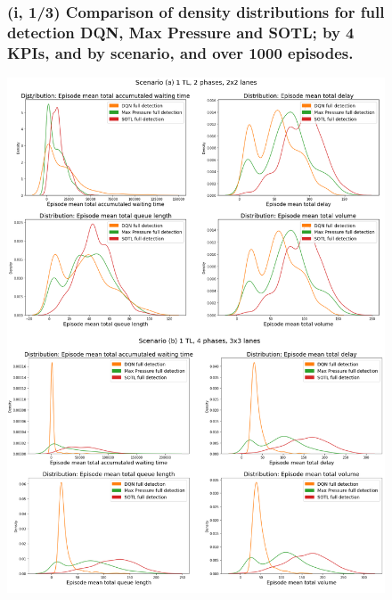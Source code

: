 \pagebreak

\begin{figure}[h]
\subsubsection*{(i, 1/3) Comparison of density distributions for full detection DQN, Max Pressure and SOTL; by 4 KPIs, and by scenario, and over 1000 episodes.}
\includegraphics[width=\textwidth]{img/Appendix/1_1-2.png}
\centering
\end{figure}
\restoregeometry

\pagebreak


